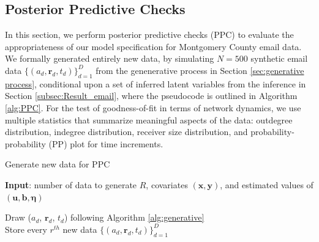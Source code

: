 \documentclass[ba]{imsart}
\def\spacingset#1{\renewcommand{\baselinestretch}%
	{#1}\small\normalsize} \spacingset{1}
\numberwithin{equation}{section}
\theoremstyle{plain}
\begin{document}
	\subsection{Posterior Predictive Checks}\label{subsec:PPC_email} 	   
In this section, we perform posterior predictive checks (PPC) \citep{rubin1984bayesianly} to evaluate the appropriateness of our model specification for Montgomery County email data. We formally generated entirely new data, by simulating $N=500$ synthetic email data $\{(a_{d}, \boldsymbol{r}_{d}, t_{d})\}_{d=1}^D$ from the genenerative process in Section \ref{sec:generative process}, conditional upon a set of inferred latent variables from the inference in Section \ref{subsec:Result_email}, where the pseudocode is outlined in Algorithm \ref{alg:PPC}. For the test of goodness-of-fit in terms of network dynamics, we use multiple statistics that summarize meaningful aspects of the data: outdegree distribution, indegree distribution, receiver size distribution, and probability-probability (PP) plot for time increments. 
	\begin{algorithm}[!t]
		\spacingset{1}
		\caption{Generate new data for PPC}
		\begin{algorithmic}
			\STATE \textbf{Input}: number of data to generate $R$, covariates $(\boldsymbol{x},\boldsymbol{y})$, and estimated values of $(\boldsymbol{u}, \boldsymbol{b}, \boldsymbol{\eta})$\\
			\vskip 0.1in
			
			\STATE	Draw ($a_{d}$, $\boldsymbol{r}_{d}$, $t_{d}$) following Algorithm \ref{alg:generative}\\
			\ENDFOR
			\STATE Store every $r^{th}$ new data $\{(a_{d}, \boldsymbol{r}_{d}, t_{d})\}_{d=1}^D$ 
			\ENDFOR
		\end{algorithmic}
		\label{alg:PPC}
	\end{algorithm}       
		
\end{document}
